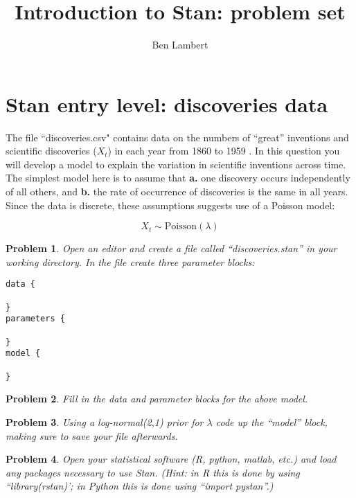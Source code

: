 \documentclass{article}
\title{Introduction to Stan: problem set}
\date{}
\author{Ben Lambert}
\newtheorem{problem}{Problem}[section]
\begin{document}
\maketitle

\section{Stan entry level: discoveries data}
The file ``discoveries.csv" contains data on the numbers of ``great'' inventions and scientific discoveries ($X_t$) in each year from 1860 to 1959 \citep{discoveries}. In this question you will develop a model to explain the variation in scientific inventions across time. The simplest model here is to assume that \textbf{a.} one discovery occurs independently of all others, and \textbf{b.} the rate of occurrence of discoveries is the same in all years. Since the data is discrete, these assumptions suggests use of a Poisson model:

\begin{equation}
X_t\sim \text{Poisson}(\lambda)
\end{equation}

\begin{problem}
Open an editor and create a file called ``discoveries.stan'' in your working directory. In the file create three parameter blocks:
	
\begin{verbatim}
data {
	
}
parameters {
	
}
model {
	
}
\end{verbatim}	
\end{problem}

\begin{problem}
Fill in the data and parameter blocks for the above model.
\end{problem}


\begin{problem}
	Using a log-normal(2,1)  prior for $\lambda$ code up the ``model'' block, making sure to save your file afterwards.
\end{problem}

\begin{problem}
	Open your statistical software (R, python, matlab, etc.) and load any packages necessary to use Stan. (Hint: in R this is done by using ``library(rstan)'; in Python this is done using ``import pystan''.)
\end{problem}
\end{document}
